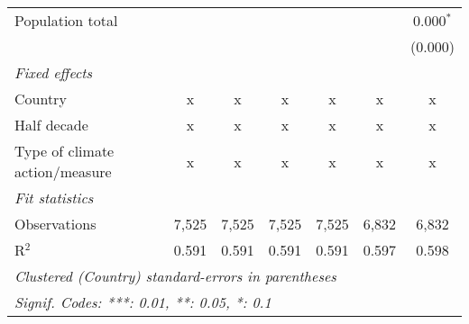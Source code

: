 \begin{tabular}{lcccccc}
   Population total                              &         &         &         &         &         & 0.000$^{*}$\\   
                                                 &         &         &         &         &         & (0.000)\\   
   \emph{Fixed effects}\\
   Country                                       & x       & x       & x       & x       & x       & x\\  
   Half decade                                   & x       & x       & x       & x       & x       & x\\  
   Type of climate action/measure                & x       & x       & x       & x       & x       & x\\  
   \midrule \emph{Fit statistics}\\
   Observations                                  & 7,525   & 7,525   & 7,525   & 7,525   & 6,832   & 6,832\\  
   R$^2$                                         & 0.591   & 0.591   & 0.591   & 0.591   & 0.597   & 0.598\\  
   \midrule
   \multicolumn{7}{l}{\emph{Clustered (Country) standard-errors in parentheses}}\\
   \multicolumn{7}{l}{\emph{Signif. Codes: ***: 0.01, **: 0.05, *: 0.1}}\\
\end{tabular}
\par\endgroup


